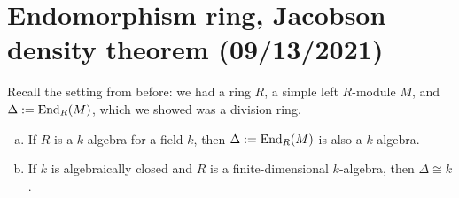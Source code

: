 \section{Endomorphism ring, Jacobson density theorem (09/13/2021)}
Recall the setting from before: we had a ring $R$, a simple left $R$-module $M$,
and $\Delta := \operatorname{End}_R(M)$, which we showed was a division ring. 

\begin{prop}{}
\begin{enumerate}[(a)]
    \item If $R$ is a $k$-algebra for a field $k$, then $\Delta := \operatorname{End}_R(M)$ is also a $k$-algebra. 
    \item If $k$ is algebraically closed and $R$ is a finite-dimensional $k$-algebra, then $\Delta 
    \cong k$. 
\end{enumerate}
\end{prop}
